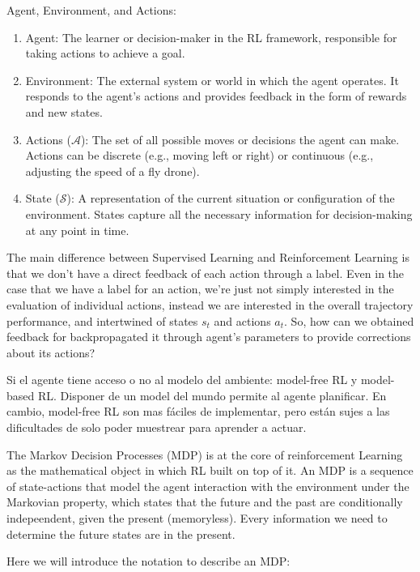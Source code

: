 Agent, Environment, and Actions:
\begin{enumerate}
    \item Agent: The learner or decision-maker in the RL framework, responsible for taking actions to achieve a goal. 
    \item Environment: The external system or world in which the agent operates. It responds to the agent's actions and provides feedback in the form of rewards and new states. 
    \item Actions ($\mathcal{A}$): The set of all possible moves or decisions the agent can make. Actions can be discrete (e.g., moving left or right) or continuous (e.g., adjusting the speed of a fly drone). 
    \item State ($\mathcal{S}$): A representation of the current situation or configuration of the environment. States capture all the necessary information for decision-making at any point in time.
\end{enumerate}



The main difference between Supervised Learning and Reinforcement Learning is that we don't have a direct feedback of each action through a label. Even in the case that we have a label for an action, we're just not simply interested in the evaluation of individual actions, instead we are interested in the overall trajectory performance, and intertwined of states $s_t$ and actions $a_t$. So, how can we obtained feedback for backpropagated it through agent's parameters to provide corrections about its actions?

Si el agente tiene acceso o no al modelo del ambiente: model-free RL y model-based RL. Disponer de un model del mundo permite al agente planificar. 
En cambio, model-free RL son mas fáciles de implementar, pero están
sujes a las dificultades de solo poder muestrear para aprender a 
actuar.

The Markov Decision Processes (MDP) is at the core of reinforcement Learning as the mathematical object in which RL built on top of it. An MDP is a sequence of state-actions that model the agent interaction with the environment under the Markovian property, which states that the future and the past are
conditionally indepeendent, given the present (memoryless). Every information we
need to determine the future states are in the present.

Here we will introduce the notation to describe an MDP:

